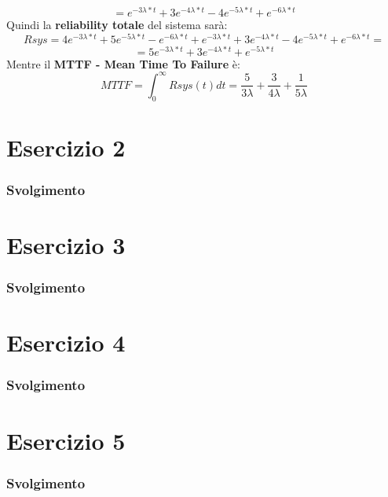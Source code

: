 \begin{equation*}
	 = e^{-3\lambda*t} + 3e^{-4\lambda*t} -4e^{-5\lambda*t} +e^{-6\lambda*t}
\end{equation*}
Quindi la \textbf{reliability totale} del sistema sarà:
\begin{equation*}
	Rsys = 4e^{-3\lambda*t}+5e^{-5\lambda*t}-e^{-6\lambda*t} + e^{-3\lambda*t} + 3e^{-4\lambda*t} -4e^{-5\lambda*t} +e^{-6\lambda*t} = 
\end{equation*}
\begin{equation*}
	 = 5e^{-3\lambda*t}+3e^{-4\lambda*t}+ e^{-5\lambda*t}
\end{equation*}
Mentre il \textbf{MTTF - Mean Time To Failure} è:
\begin{equation*}
	MTTF = \int_{0}^{\infty} Rsys(t)dt = \frac{5}{3\lambda}+\frac{3}{4\lambda}+\frac{1}{5\lambda}
\end{equation*}
\section{Esercizio 2}
\subsubsection{Svolgimento}
\section{Esercizio 3}
\subsubsection{Svolgimento}
\section{Esercizio 4}
\subsubsection{Svolgimento}
\section{Esercizio 5}
\subsubsection{Svolgimento}